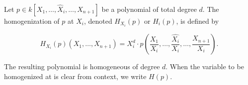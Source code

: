 Let $p \in k[X_1, \ldots, \hat{X}_i, \ldots, X_{n+1}]$ be a polynomial of total degree $d$. The homogenization of $p$ at $X_i$, denoted $H_{X_i}(p)$ or $H_i(p)$, is defined by

$$H_{X_i}(p)(X_1, \ldots, X_{n+1}) = X_i^d \cdot p\!\left(\frac{X_1}{X_i}, \ldots, \frac{\widehat{X_i}}{X_i}, \ldots, \frac{X_{n+1}}{X_i}\right).$$

The resulting polynomial is homogeneous of degree $d$. When the variable to be homogenized at is clear from context, we write $H(p)$.
